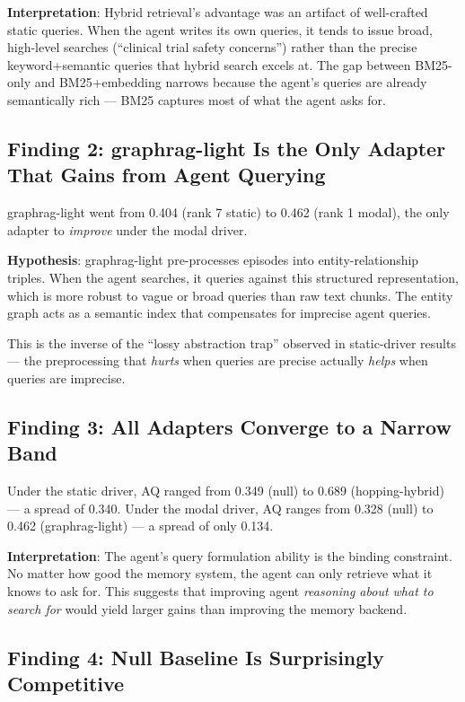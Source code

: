 \documentclass[11pt,a4paper]{article}
\begin{document}
\textbf{Interpretation}: Hybrid retrieval's advantage was an artifact of well-crafted static queries.
When the agent writes its own queries, it tends to issue broad, high-level searches (``clinical trial safety concerns'') rather than the precise keyword+semantic queries that hybrid search excels at.
The gap between BM25-only and BM25+embedding narrows because the agent's queries are already semantically rich --- BM25 captures most of what the agent asks for.

\subsection{Finding 2: graphrag-light Is the Only Adapter That Gains from Agent Querying}

graphrag-light went from 0.404 (rank 7 static) to 0.462 (rank 1 modal), the only adapter to \emph{improve} under the modal driver.

\textbf{Hypothesis}: graphrag-light pre-processes episodes into entity-relationship triples.
When the agent searches, it queries against this structured representation, which is more robust to vague or broad queries than raw text chunks.
The entity graph acts as a semantic index that compensates for imprecise agent queries.

This is the inverse of the ``lossy abstraction trap'' observed in static-driver results --- the preprocessing that \emph{hurts} when queries are precise actually \emph{helps} when queries are imprecise.

\subsection{Finding 3: All Adapters Converge to a Narrow Band}

Under the static driver, AQ ranged from 0.349 (null) to 0.689 (hopping-hybrid) --- a spread of 0.340.
Under the modal driver, AQ ranges from 0.328 (null) to 0.462 (graphrag-light) --- a spread of only 0.134.

\textbf{Interpretation}: The agent's query formulation ability is the binding constraint.
No matter how good the memory system, the agent can only retrieve what it knows to ask for.
This suggests that improving agent \emph{reasoning about what to search for} would yield larger gains than improving the memory backend.

\subsection{Finding 4: Null Baseline Is Surprisingly Competitive}
\end{document}
